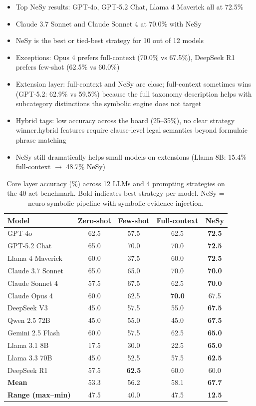 \documentclass[10pt, a4paper]{article}
\begin{document}
\begin{itemize}
\item Top NeSy results: GPT-4o, GPT-5.2 Chat, Llama 4 Maverick all at 72.5\%
\item Claude 3.7 Sonnet and Claude Sonnet 4 at 70.0\% with NeSy
\item NeSy is the best or tied-best strategy for 10 out of 12 models
\item Exceptions: Opus 4 prefers full-context (70.0\% vs 67.5\%), DeepSeek R1 prefers few-shot (62.5\% vs 60.0\%)
\item Extension layer: full-context and NeSy are close; full-context sometimes wins (GPT-5.2: 62.9\% vs 59.5\%) because the full taxonomy description helps with subcategory distinctions the symbolic engine does not target
\item Hybrid tags: low accuracy across the board (25--35\%), no clear strategy winner.hybrid features require clause-level legal semantics beyond formulaic phrase matching
\item NeSy still dramatically helps small models on extensions (Llama 8B: 15.4\% full-context $\rightarrow$ 48.7\% NeSy)
\end{itemize}

\begin{table}[t]
\centering
\small
\begin{tabular}{l *{4}{c}}
\toprule
\textbf{Model} & \textbf{Zero-shot} & \textbf{Few-shot} & \textbf{Full-context} & \textbf{NeSy} \\
\midrule
GPT-4o              & 62.5 & 57.5 & 62.5 & \textbf{72.5} \\
GPT-5.2 Chat        & 65.0 & 70.0 & 70.0 & \textbf{72.5} \\
Llama 4 Maverick    & 60.0 & 37.5 & 60.0 & \textbf{72.5} \\
Claude 3.7 Sonnet   & 65.0 & 65.0 & 70.0 & \textbf{70.0} \\
Claude Sonnet 4     & 57.5 & 67.5 & 62.5 & \textbf{70.0} \\
Claude Opus 4       & 60.0 & 62.5 & \textbf{70.0} & 67.5 \\
DeepSeek V3         & 45.0 & 57.5 & 55.0 & \textbf{67.5} \\
Qwen 2.5 72B        & 45.0 & 55.0 & 45.0 & \textbf{67.5} \\
Gemini 2.5 Flash    & 60.0 & 57.5 & 62.5 & \textbf{65.0} \\
Llama 3.1 8B        & 17.5 & 30.0 & 22.5 & \textbf{65.0} \\
Llama 3.3 70B       & 45.0 & 52.5 & 57.5 & \textbf{62.5} \\
DeepSeek R1         & 57.5 & \textbf{62.5} & 60.0 & 60.0 \\
\midrule
\textbf{Mean}       & 53.3 & 56.2 & 58.1 & \textbf{67.7} \\
\textbf{Range (max--min)} & 47.5 & 40.0 & 47.5 & \textbf{12.5} \\
\bottomrule
\end{tabular}
\caption{Core layer accuracy (\%) across 12 LLMs and 4 prompting strategies on the 40-act benchmark. Bold indicates best strategy per model. NeSy = neuro-symbolic pipeline with symbolic evidence injection.}
\label{tab:results}
\end{table}
\end{document}
